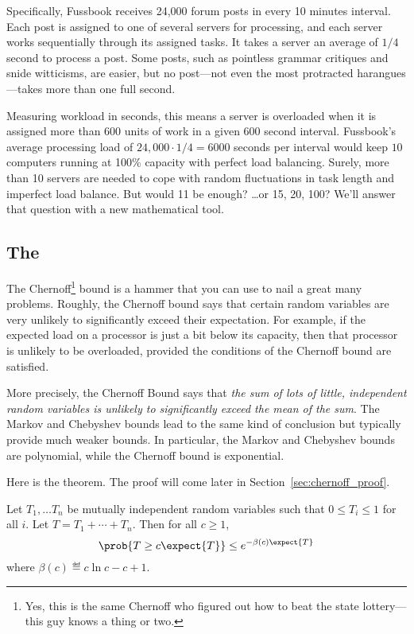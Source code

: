 Specifically, Fussbook receives 24,000 forum posts in every 10 minutes
interval.  Each post is assigned to one of several servers for
processing, and each server works sequentially through its assigned
tasks.  It takes a server an average of $1/4$ second to process a
post.  Some posts, such as pointless grammar critiques and snide
witticisms, are easier, but no post---not even the most protracted
harangues---takes more than one full second.

Measuring workload in seconds, this means a server is overloaded when
it is assigned more than 600 units of work in a given 600 second
interval.  Fussbook's average processing load of $24{,}000 \cdot 1/4 =
6000$ seconds per interval would keep $10$ computers running at 100\%
capacity with perfect load balancing.  Surely, more than 10 servers
are needed to cope with random fluctuations in task length and
imperfect load balance.  But would 11 be enough? \dots or 15, 20, 100?
We'll answer that question with a new mathematical tool.

\subsection{The }\label{chernoff_sec}

The Chernoff\footnote{Yes, this is the same Chernoff who figured out
  how to beat the state lottery---this guy knows a thing or two.}
bound is a hammer that you can use to nail a great many problems.
Roughly, the Chernoff bound says that certain random variables are
very unlikely to significantly exceed their expectation.  For example,
if the expected load on a processor is just a bit below its capacity,
then that processor is unlikely to be overloaded, provided the
conditions of the Chernoff bound are satisfied.

More precisely, the Chernoff Bound says that \emph{the sum of lots of
  little, independent random variables is unlikely to significantly
  exceed the mean of the sum}.  The Markov and Chebyshev bounds lead
to the same kind of conclusion but typically provide much weaker
bounds.  In particular, the Markov and Chebyshev bounds are
polynomial, while the Chernoff bound is exponential.

Here is the theorem.  The proof will come later in
Section~\ref{sec:chernoff_proof}.

\begin{theorem}
\label{thm:chernoff}
Let $T_1, \dots T_n$ be mutually independent random variables such
that $0 \leq T_i \leq 1$ for all $i$.  Let $T = T_1 + \cdots + T_n$.
Then for all $c \geq 1$,
\begin{equation}\label{chernoff-leq}
\prob{T \geq c \expect{T}} \leq e^{-\beta(c) \expect{T}}
\end{equation}
where $\beta(c) \eqdef c \ln c - c + 1$.
\end{theorem}

